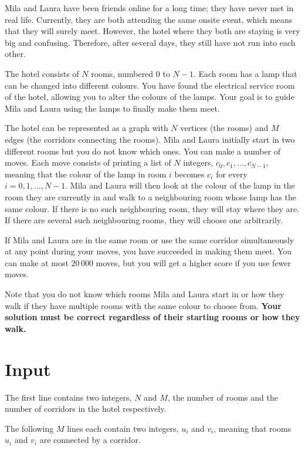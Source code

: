 
Mila and Laura have been friends online for a long time; they have never met in real life.
Currently, they are both attending the same onsite event, which means that they will surely meet.
However, the hotel where they both are staying is very big and confusing. Therefore, after several days,
they still have not run into each other.

The hotel consists of $N$ rooms, numbered $0$ to $N-1$. Each room has a lamp that can be changed into different colours.
You have found the electrical
service room of the hotel, allowing you to alter the colours of the lamps.
Your goal is to guide Mila and Laura using the lamps to finally make them meet.

The hotel can be represented as a graph with $N$ vertices (the rooms) and $M$ edges (the corridors connecting the rooms).
Mila and Laura
initially start in two different rooms but you do not know which ones. You can make a number
of moves. Each move consists of printing a list of $N$ integers, $c_0, c_1, \ldots, c_{N-1}$, meaning
that the colour of the lamp in room $i$ becomes $c_i$ for every $i = 0,1,\ldots,N-1$. Mila and Laura will then look
at the colour of the lamp in the room they are currently in and walk to a neighbouring room
whose lamp has the same colour. If there is no such neighbouring room, they will stay where
they are.
If there are several such neighbouring rooms, they will choose one arbitrarily.

If Mila and Laura are in the same room or use the same corridor simultaneously at any point during your moves, you have succeeded in making them meet.
You can make at most $20\,000$ moves, but you will
get a higher score if you use fewer moves.

Note that you do not know which rooms Mila and Laura start in or how they walk if they have multiple rooms with the same colour to choose from. \textbf{Your solution must be correct regardless of their starting rooms or how they walk.}

\section*{Input}
The first line contains two integers, $N$ and $M$, the number of rooms and the number of corridors in the hotel respectively.

The following $M$ lines each contain two integers, $u_i$ and $v_i$, meaning that rooms
$u_i$ and $v_i$ are connected by a corridor.

